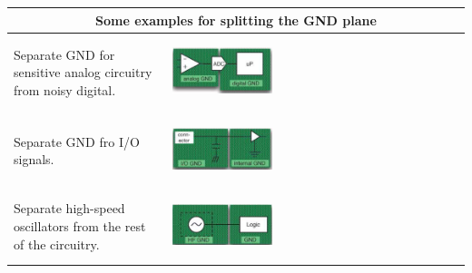 		
		\begin{table}[h!]
		\centering
		\begin{tabular}{|m{}|m{}|}
				\multicolumn{2}{c}{\textbf{Some examples for splitting the GND plane}}
			\\
			\hline
				Separate GND for sensitive analog circuitry from noisy digital. 
			& 
				 \begin{center}\includegraphics[width=0.35\textwidth]{images/GNDSep1.png}\end{center}  
			\\
			\hline
				Separate GND fro I/O signals.
			& 
				 \begin{center}\includegraphics[width=0.35\textwidth]{images/GNDSep2.png}\end{center}  
			\\
			\hline
				Separate high-speed oscillators from the rest of the circuitry. 	
			& 
				 \begin{center}\includegraphics[width=0.35\textwidth]{images/GNDSep3.png}\end{center}  
			\\
			\hline
			\end{tabular}
		\end{table}	
